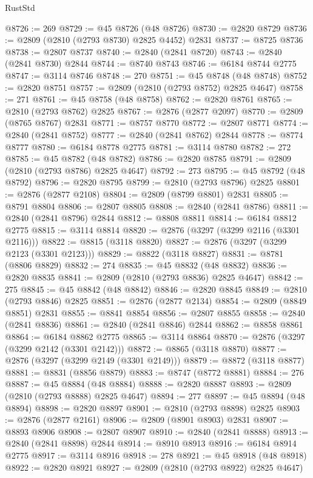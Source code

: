 \begin{lexlean}{RustStd}
\begin{coremodule}
@8726 := 269
@8729 := @45 @8726 (@48 @8726)
@8730 := @2820 @8729
@8736 := @2809 (@2810 (@2793 @8730) @2825 @4452) @2831
@8737 := @8725 @8736
@8738 := @2807 @8737
@8740 := @2840 (@2841 @8720)
@8743 := @2840 (@2841 @8730) @2844
@8744 := @8740 @8743
@8746 := @6184 @8744 @2775
@8747 := @3114 @8746
@8748 := 270
@8751 := @45 @8748 (@48 @8748)
@8752 := @2820 @8751
@8757 := @2809 (@2810 (@2793 @8752) @2825 @4647)
@8758 := 271
@8761 := @45 @8758 (@48 @8758)
@8762 := @2820 @8761
@8765 := @2810 (@2793 @8762) @2825
@8767 := @2876 (@2877 @2097)
@8770 := @2809 (@8765 @8767) @2831
@8771 := @8757 @8770
@8772 := @2807 @8771
@8774 := @2840 (@2841 @8752)
@8777 := @2840 (@2841 @8762) @2844
@8778 := @8774 @8777
@8780 := @6184 @8778 @2775
@8781 := @3114 @8780
@8782 := 272
@8785 := @45 @8782 (@48 @8782)
@8786 := @2820 @8785
@8791 := @2809 (@2810 (@2793 @8786) @2825 @4647)
@8792 := 273
@8795 := @45 @8792 (@48 @8792)
@8796 := @2820 @8795
@8799 := @2810 (@2793 @8796) @2825
@8801 := @2876 (@2877 @2108)
@8804 := @2809 (@8799 @8801) @2831
@8805 := @8791 @8804
@8806 := @2807 @8805
@8808 := @2840 (@2841 @8786)
@8811 := @2840 (@2841 @8796) @2844
@8812 := @8808 @8811
@8814 := @6184 @8812 @2775
@8815 := @3114 @8814
@8820 := @2876 (@3297 (@3299 @2116 (@3301 @2116)))
@8822 := @8815 (@3118 @8820)
@8827 := @2876 (@3297 (@3299 @2123 (@3301 @2123)))
@8829 := @8822 (@3118 @8827)
@8831 := @8781 (@8806 @8829)
@8832 := 274
@8835 := @45 @8832 (@48 @8832)
@8836 := @2820 @8835
@8841 := @2809 (@2810 (@2793 @8836) @2825 @4647)
@8842 := 275
@8845 := @45 @8842 (@48 @8842)
@8846 := @2820 @8845
@8849 := @2810 (@2793 @8846) @2825
@8851 := @2876 (@2877 @2134)
@8854 := @2809 (@8849 @8851) @2831
@8855 := @8841 @8854
@8856 := @2807 @8855
@8858 := @2840 (@2841 @8836)
@8861 := @2840 (@2841 @8846) @2844
@8862 := @8858 @8861
@8864 := @6184 @8862 @2775
@8865 := @3114 @8864
@8870 := @2876 (@3297 (@3299 @2142 (@3301 @2142)))
@8872 := @8865 (@3118 @8870)
@8877 := @2876 (@3297 (@3299 @2149 (@3301 @2149)))
@8879 := @8872 (@3118 @8877)
@8881 := @8831 (@8856 @8879)
@8883 := @8747 (@8772 @8881)
@8884 := 276
@8887 := @45 @8884 (@48 @8884)
@8888 := @2820 @8887
@8893 := @2809 (@2810 (@2793 @8888) @2825 @4647)
@8894 := 277
@8897 := @45 @8894 (@48 @8894)
@8898 := @2820 @8897
@8901 := @2810 (@2793 @8898) @2825
@8903 := @2876 (@2877 @2161)
@8906 := @2809 (@8901 @8903) @2831
@8907 := @8893 @8906
@8908 := @2807 @8907
@8910 := @2840 (@2841 @8888)
@8913 := @2840 (@2841 @8898) @2844
@8914 := @8910 @8913
@8916 := @6184 @8914 @2775
@8917 := @3114 @8916
@8918 := 278
@8921 := @45 @8918 (@48 @8918)
@8922 := @2820 @8921
@8927 := @2809 (@2810 (@2793 @8922) @2825 @4647)

\end{coremodule}
\end{lexlean}
